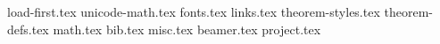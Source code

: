 
{load-first.tex}
{unicode-math.tex}
{fonts.tex}
{links.tex}
{theorem-styles.tex}
{theorem-defs.tex}
{math.tex}
{bib.tex}
{misc.tex}
{beamer.tex}
{project.tex}
